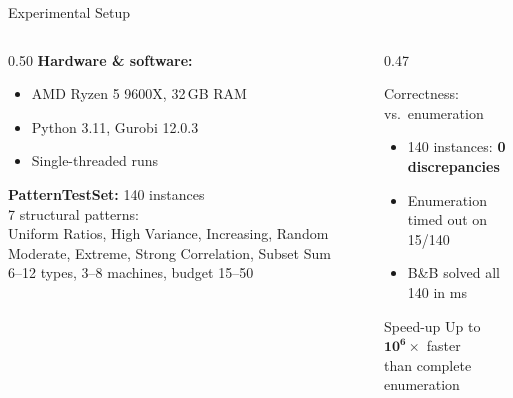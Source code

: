 \documentclass[fleqn,11pt,aspectratio=43]{beamer}
\begin{document}
\begin{frame}[shrink=5]{Experimental Setup}
  \begin{columns}[T]
    \begin{column}{0.50\textwidth}
      \textbf{Hardware \& software:}
      \begin{itemize}
        \item AMD Ryzen 5 9600X, 32\,GB RAM
        \item Python 3.11, Gurobi 12.0.3
        \item Single-threaded runs
      \end{itemize}
      \textbf{PatternTestSet:} 140 instances\\
      7 structural patterns:\\
      \footnotesize Uniform Ratios, High Variance, Increasing, Random Moderate,
      Extreme, Strong Correlation, Subset Sum\\
      \normalsize 6--12 types, 3--8 machines, budget 15--50
    \end{column}
    \begin{column}{0.47\textwidth}
      \begin{block}{Correctness: vs.\ enumeration}
        \begin{itemize}
          \item 140 instances: \textbf{0 discrepancies}
          \item Enumeration timed out on 15/140
          \item B\&B solved all 140 in ms
        \end{itemize}
      \end{block}
      \begin{alertblock}{Speed-up}
        Up to $\mathbf{10^6\times}$ faster\\than complete enumeration
      \end{alertblock}
    \end{column}
  \end{columns}
\end{frame}
\end{document}
